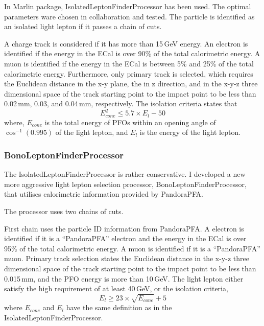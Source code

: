 In Marlin package, IsolatedLeptonFinderProcessor has been used. The optimal parameters ware chosen in collaboration and tested. The particle is identified as an isolated light lepton if it passes a chain of cuts.

A charge track is considered if it has more than 15\,GeV energy. An electron is identified if the energy in the ECal is over 90\% of the total calorimetric energy. A muon is identified if the energy in the ECal is between 5\% and 25\% of the total calorimetric energy. Furthermore, only primary track is selected, which requires the Euclidean distance in the x-y plane, the in z direction, and in the x-y-z three dimensional space of the track starting point to the impact point to be less than 0.02\,mm, 0.03\mm, and  0.04\,mm, respectively. The isolation criteria states that
\begin{equation}
E_{cone}^2 \leqslant 5.7 \times E_{l} - 50
\end{equation}
where, $E_{cone}$ is the total energy of PFOs within an opening angle of $\cos^{-1}(0.995)$ of the light lepton, and $E_{l}$ is the energy of the light lepton.

\subsubsection{BonoLeptonFinderProcessor}

The IsolatedLeptonFinderProcessor is rather conservative. I developed a new more aggressive light lepton selection processor, BonoLeptonFinderProcessor, that utilises calorimetric information provided by PandoraPFA.

The processor uses two chains of cuts.

First chain uses the particle ID information from PandoraPFA. A electron is identified if it is a ``PandoraPFA'' electron and the energy in the ECal is over 95\% of the total calorimetric energy. A muon is identified if it is a ``PandoraPFA'' muon.  Primary track selection states the Euclidean distance in the x-y-z three dimensional space of the track starting point to the impact point to be less than 0.015\,mm, and the PFO energy is more than 10\,GeV. The light lepton either satisfy the high \pT requirement of at least 40\,GeV, or the isolation criteria,
\begin{equation}
E_{l} \geqslant 23 \times \sqrt{E_{cone}} + 5
\end{equation}
where $E_{cone}$ and $E_{l}$ have the same definition as in the IsolatedLeptonFinderProcessor.

